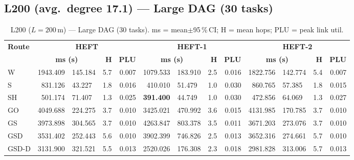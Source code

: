 \documentclass[11pt]{article}
\newcommand{\win}[1]{\textcolor{green!50!black}{\textbf{#1}}}
\newcommand{\bad}[1]{\textcolor{red!70!black}{#1}}
\begin{document}
\subsection{L200 (avg.\ degree 17.1) --- Large DAG (30 tasks)}
\begin{table}[H]\centering\small
\begin{tabular}{l r@{$\pm$}l r r r@{$\pm$}l r r r@{$\pm$}l r r}
\toprule
\textbf{Route} & \multicolumn{4}{c}{\textbf{HEFT}} & \multicolumn{4}{c}{\textbf{HEFT-1}} & \multicolumn{4}{c}{\textbf{HEFT-2}} \\
\cmidrule(lr){2-5}\cmidrule(lr){6-9}\cmidrule(lr){10-13}
& \multicolumn{2}{c}{\textbf{ms (s)}} & \textbf{H} & \textbf{PLU}& \multicolumn{2}{c}{\textbf{ms (s)}} & \textbf{H} & \textbf{PLU}& \multicolumn{2}{c}{\textbf{ms (s)}} & \textbf{H} & \textbf{PLU} \\
\midrule
  W & 1943.409 & 145.184 & 5.7 & 0.007 & 1079.533 & 183.910 & 2.5 & 0.016 & 1822.756 & 142.774 & 5.4 & 0.007 \\
  S & 831.126 & 43.227 & 1.8 & 0.016 & 410.010 & 51.479 & 1.0 & 0.030 & 860.765 & 57.385 & 1.8 & 0.015 \\
  SH & 501.174 & 71.407 & 1.3 & 0.025 & \win{391.400} & 44.749 & 1.0 & 0.030 & 472.856 & 64.069 & 1.3 & 0.027 \\
  GO & \bad{4049.688} & 224.275 & 3.7 & 0.010 & 3425.021 & 470.992 & 3.6 & 0.015 & \bad{4131.985} & 170.785 & 3.7 & 0.010 \\
  GS & 3973.898 & 304.565 & 3.7 & 0.010 & \bad{4263.847} & 803.378 & 3.5 & 0.011 & 3671.203 & 273.076 & 3.7 & 0.010 \\
  GSD & 3531.402 & 252.443 & 5.6 & 0.010 & 3902.399 & 746.826 & 2.5 & 0.013 & 3652.316 & 274.661 & 5.7 & 0.010 \\
  GSD-D & 3131.900 & 321.521 & 5.5 & 0.013 & 2520.026 & 176.308 & 2.3 & 0.018 & 2981.828 & 313.006 & 5.7 & 0.013 \\
\bottomrule\end{tabular}
\caption{L200 ($L=200$\,m) --- Large DAG (30 tasks). ms = mean$\pm$95\,\%\,CI; H = mean hops; PLU = peak link util.}
\end{table}
\end{document}
